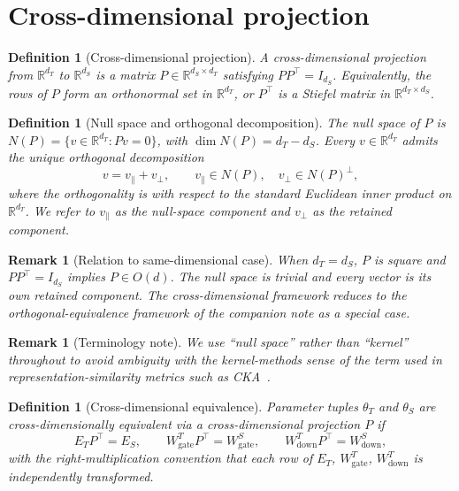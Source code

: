 \documentclass{article}
\newtheorem{definition}[theorem]{Definition}
\newtheorem{remark}[theorem]{Remark}
\begin{document}
\section{Cross-dimensional projection}
\label{sec:projection}

\begin{definition}[Cross-dimensional projection]
	\label{def:projection}
	A \emph{cross-dimensional projection} from $\mathbb{R}^{d_T}$ to $\mathbb{R}^{d_S}$ is a matrix $P \in \mathbb{R}^{d_S \times d_T}$ satisfying $P P^\top = I_{d_S}$. Equivalently, the rows of $P$ form an orthonormal set in $\mathbb{R}^{d_T}$, or $P^\top$ is a Stiefel matrix in $\mathbb{R}^{d_T \times d_S}$.
\end{definition}

\begin{definition}[Null space and orthogonal decomposition]
	\label{def:nullspace}
	The \emph{null space} of $P$ is $N(P) = \{v \in \mathbb{R}^{d_T} : Pv = 0\}$, with $\dim N(P) = d_T - d_S$. Every $v \in \mathbb{R}^{d_T}$ admits the unique orthogonal decomposition
	\[
		v = v_\parallel + v_\perp, \qquad v_\parallel \in N(P), \quad v_\perp \in N(P)^\perp,
	\]
	where the orthogonality is with respect to the standard Euclidean inner product on $\mathbb{R}^{d_T}$. We refer to $v_\parallel$ as the \emph{null-space component} and $v_\perp$ as the \emph{retained component}.
\end{definition}

\begin{remark}[Relation to same-dimensional case]
	\label{rem:same-dim}
	When $d_T = d_S$, $P$ is square and $PP^\top = I_{d_S}$ implies $P \in O(d)$. The null space is trivial and every vector is its own retained component. The cross-dimensional framework reduces to the orthogonal-equivalence framework of the companion note as a special case.
\end{remark}

\begin{remark}[Terminology note]
	\label{rem:kernel}
	We use ``null space'' rather than ``kernel'' throughout to avoid ambiguity with the kernel-methods sense of the term used in representation-similarity metrics such as CKA~\citep{kornblith_2019}.
\end{remark}

\begin{definition}[Cross-dimensional equivalence]
	\label{def:cross-equiv}
	Parameter tuples $\theta_T$ and $\theta_S$ are \emph{cross-dimensionally equivalent} via a cross-dimensional projection $P$ if
	\[
		E_T P^\top = E_S, \qquad W_{\mathrm{gate}}^T P^\top = W_{\mathrm{gate}}^S, \qquad W_{\mathrm{down}}^T P^\top = W_{\mathrm{down}}^S,
	\]
	with the right-multiplication convention that each row of $E_T$, $W_{\mathrm{gate}}^T$, $W_{\mathrm{down}}^T$ is independently transformed.
\end{definition}
\end{document}
